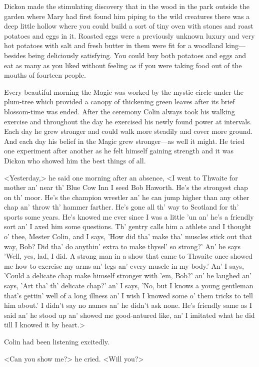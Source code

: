 Dickon made the stimulating discovery that in the wood in the park outside the garden where Mary had first found him piping to the wild creatures there was a deep little hollow where you could build a sort of tiny oven with stones and roast potatoes and eggs in it. Roasted eggs were a previously unknown luxury and very hot potatoes with salt and fresh butter in them were fit for a woodland king—besides being deliciously satisfying. You could buy both potatoes and eggs and eat as many as you liked without feeling as if you were taking food out of the mouths of fourteen people.

Every beautiful morning the Magic was worked by the mystic circle under the plum-tree which provided a canopy of thickening green leaves after its brief blossom-time was ended. After the ceremony Colin always took his walking exercise and throughout the day he exercised his newly found power at intervals. Each day he grew stronger and could walk more steadily and cover more ground. And each day his belief in the Magic grew stronger—as well it might. He tried one experiment after another as he felt himself gaining strength and it was Dickon who showed him the best things of all.

<Yesterday,> he said one morning after an absence, <I went to Thwaite for mother an' near th' Blue Cow Inn I seed Bob Haworth. He's the strongest chap on th' moor. He's the champion wrestler an' he can jump higher than any other chap an' throw th' hammer farther. He's gone all th' way to Scotland for th' sports some years. He's knowed me ever since I was a little 'un an' he's a friendly sort an' I axed him some questions. Th' gentry calls him a athlete and I thought o' thee, Mester Colin, and I says, 'How did tha' make tha' muscles stick out that way, Bob? Did tha' do anythin' extra to make thysel' so strong?' An' he says 'Well, yes, lad, I did. A strong man in a show that came to Thwaite once showed me how to exercise my arms an' legs an' every muscle in my body.' An' I says, 'Could a delicate chap make himself stronger with 'em, Bob?' an' he laughed an' says, 'Art tha' th' delicate chap?' an' I says, 'No, but I knows a young gentleman that's gettin' well of a long illness an' I wish I knowed some o' them tricks to tell him about.' I didn't say no names an' he didn't ask none. He's friendly same as I said an' he stood up an' showed me good-natured like, an' I imitated what he did till I knowed it by heart.>

Colin had been listening excitedly.

<Can you show me?> he cried. <Will you?>

